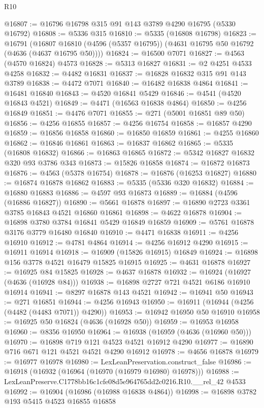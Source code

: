 \begin{lexlean}{R10}
\begin{coremodule}
@16807 := @16796 @16798 @315 @91 @143 @3789 @4290 @16795 (@5330 @16792)
@16808 := @5336 @315
@16810 := @5335 (@16808 @16798)
@16823 := @16791
    (@16807 @16810 (@4596 (@5357 @16795)) (@4631 @16795 @50 @16792 (@4636 (@4637 @16795 @50))))
@16824 := @16500 @7071
@16827 := @4563 (@4570 @16824) @4573
@16828 := @5313 @16827
@16831 := @2 @4251 @4533 @4258
@16832 := @4482 @16831
@16837 := @16828 @16832 @315 @91 @143 @3789
@16838 := @4472 @7071
@16840 := @16482 @16838 @4864
@16841 := @16481 @16840
@16843 := @4520 @16841 @5429
@16846 := @4541 (@4520 @16843 @4521)
@16849 := @4471 (@16563 @16838 @4864)
@16850 := @4256 @16849
@16851 := @4476 @7071
@16855 := @271 (@5001 @16851 @89 @50)
@16856 := @4256 @16855
@16857 := @4256 @16754
@16858 := @16857 @4290
@16859 := @16856 @16858
@16860 := @16850 @16859
@16861 := @4255 @16860
@16862 := @16846 @16861
@16863 := @16837 @16862
@16865 := @5335 (@16808 @16832)
@16866 := @16863 @16865
@16872 := @5342 @16827 @16832 @320 @93 @3786 @343
@16873 := @15826 @16858
@16874 := @16872 @16873
@16876 := @4563 (@5378 @16754)
@16878 := @16876 (@16253 @16827)
@16880 := @16874 @16878 @16862
@16883 := @5335 (@5336 @320 @16832)
@16884 := @16880 @16883
@16886 := @4597 @93 @16873
@16889 := @16884 (@4596 (@16886 @16827))
@16890 := @5661 @16878
@16897 := @16890 @2723 @3361 @3785 @16843 @4521 @16860 @16861
@16898 := @4622 @16878
@16904 := @16898 @3780 @3784 @16841 @5429 @16849 @16859
@16909 := @5761 @16878 @3176 @3779 @16480 @16840
@16910 := @4471 @16838
@16911 := @4256 @16910
@16912 := @4781 @4864
@16914 := @4256 @16912 @4290
@16915 := @16911 @16914
@16918 := @16909 (@15826 @16915) @16849
@16924 := @16898 @156 @3778 @4521 @16479 @15825 @16915
@16925 := @4631 @16878
@16927 := @16925 @84 @15825
@16928 := @4637 @16878
@16932 := @16924 (@16927 (@4636 (@16928 @84)))
@16938 := @16898 @2727 @721 @4521 @6186 @16910 @16914
@16941 := @8297 @16878 @143 @4521
@16942 := @16941 @50
@16943 := @271 @16851
@16944 := @4256 @16943
@16950 := @16911 (@16944 (@4256 (@4482 (@4483 @7071)) @4290))
@16953 := @16942 @16950 @50 @16910
@16958 := @16925 @50 @16824 (@4636 (@16928 @50))
@16959 := @16953 @16958
@16960 := @8356 @16950
@16964 := @16938 (@16959 (@4636 (@16960 @50)))
@16970 := @16898 @719 @121 @4523 @4521 @16912 @4290
@16977 := @16890 @716 @671 @121 @4521 @4521 @4290 @16912
@16978 := @4656 @16878
@16979 := @16977 @16978
@16980 := LexLeanPreservation.construct_false
@16986 := @16918 (@16932 (@16964 (@16970 (@16979 @16980) @16978)))
@16988 := LexLeanPreserve.C1778bb16c1cfe08d5e964765dd2c0216.R10.__rel_42 @4533
@16992 := @16904 (@16986 (@16988 @16838 @4864))
@16998 := @16898 @3782 @193 @5415 @4523 @16855 @16858

\end{coremodule}
\end{lexlean}
